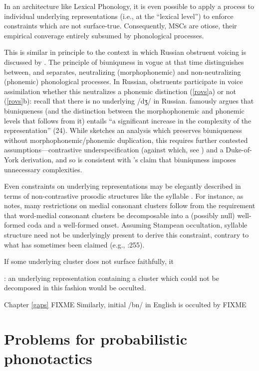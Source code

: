 In an architecture like Lexical Phonology, it is even possible to apply a process to individual underlying representations (i.e., at the ``lexical level'') to enforce constraints which are not surface-true.
Consequently, MSCs are otiose, their empirical converage entirely subsumed by phonological processes.

This is similar in principle to the context in which Russian obstruent voicing is discussed by \citet{SPR}.
The principle of biuniquness in vogue at that time distinguishes between, and separates, neutralizing (morphophonemic) and non-neutralizing (phonemic) phonological processes.
In Russian, obstruents participate in voice assimilation whether this neutralizes a phonemic distinction (\ref{rovs}a) or not (\ref{rovs}b): recall that there is no underlying /dʒ/ in Russian.
\citeauthor{SPR} famously argues that biuniqueness (and the distinction between the morphophonemic and phonemic levels that follows from it) entails ``a significant increase in the complexity of the representation'' (24).
While  sketches an analysis which preserves biuniqueness without morphophonemic/phonemic duplication, this requires further contested assumptions---contrastive underspecification (against which, see ) and a Duke-of-York derivation, and so is consistent with \citeauthor{SPR}'s claim that biuniquness imposes unnecessary complexities.

Even constraints on underlying representations may be elegantly described in terms of non-contrastive prosodic structures like the syllable \citep[e.g.,][]{Hooper1973,Kahn1976}.
For instance, as \citet{Haugen1956} notes, many restrictions on medial consonant clusters follow from the requirement that word-medial consonant clusters be decomposable into a (possibly null) well-formed coda and a well-formed onset.
Assuming Stampean occultation, syllable structure need not be underlyingly present to derive this constraint, contrary to what has sometimes been claimed (e.g., :255).



If some underlying cluster does not surface faithfully, it 



: an underlying representation containing a cluster which could not be decomposed in this fashion would be occulted.

Chapter \ref{gaps} FIXME
Similarly, initial /bn/ in English is occulted by FIXME

\section{Problems for probabilistic phonotactics}

